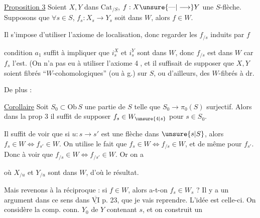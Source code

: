 

\uline{Proposition 3} Soient $X,Y$ dans $\mathrm{Cat}_{/S}$, $f:X\unsure{\text{---}|\longrightarrow}Y$ une $S$-flèche. Supposons  que $\forall s\in S$, $f_s:X_s\longrightarrow Y_s$ soit  dans $W$, alors $f\in W$.

Il s'impose d'utiliser l'axiome de localisation, donc regarder les $f_{/s}$ induits par $f$

 condition $a_1$ suffit à impliquer que  $i_s^X$ et $i_s^Y$ sont dans $W$, donc $f_{/s}$ est dans $W$ car $f_s$ l'est. (On n'a pas eu à utiliser l'axiome \textcircled{4}, et il suffisait de supposer que $X,Y$ soient fibrés ``$W$-cohomologiques''  (ou  à g.) sur $S$, ou d'ailleurs, des $W$-fibrés à dr.

De plus :

\uline{Corollaire}  Soit $S_0\subset\mathrm{Ob}\,S$ une partie de $S$ telle que $S_0\longrightarrow\pi_0(S)$ surjectif. Alors dans la prop 3 il suffit de supposer $f_s\in W_{\unsure{4|s}}$ pour $s\in S_0$.


Il suffit de voir que si $u:s\longrightarrow s'$ est une flèche dans $\unsure{s|S}$, alors $f_s\in W\Longleftrightarrow f_{s'}\in W$. On utilise le fait que $f_s\in W\Longleftrightarrow f_{/s}\in W$, et de même pour $f_{s'}$. Donc à voir que $f_{/s}\in W\Longleftrightarrow f_{/s'}\in W$. Or on a

où $X_{/u}$ et $Y_{/u}$ sont dans $W$, d'où le résultat.

Mais revenons à la réciproque : si $f\in W$, alors a-t-on $f_s\in W_s$ ? Il y a un argument dans ce sens dans $\overline{\underline{\mathrm{VI}}}$ p. 23, que je vais reprendre. L'idée  est celle-ci. On considère la comp. conn. $Y_0$ de $Y$ contenant $s$, et on  construit un

